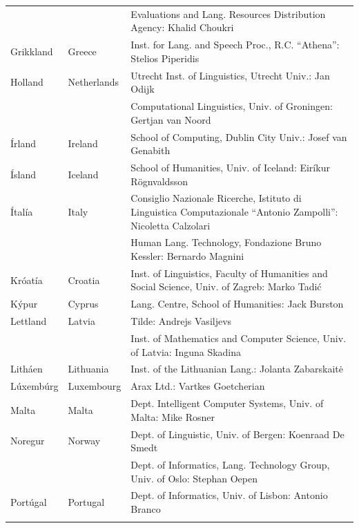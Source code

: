 \documentclass{../../metanetpaper}
\begin{document}
\begin{longtable}{llp{105mm}}
  & & Evaluations and Lang. Resources Distribution Agency: Khalid Choukri\\ \addlinespace 
  Grikkland & \textcolor{grey1}{Greece} & Inst. for Lang. and Speech Proc., R.C. “Athena”: Stelios Piperidis\\ \addlinespace 
  Holland & \textcolor{grey1}{Netherlands} & Utrecht Inst. of Linguistics, Utrecht Univ.: Jan Odijk\\ \addlinespace 
  & & Computational Linguistics, Univ. of Groningen: Gertjan van Noord\\ \addlinespace
  Írland & \textcolor{grey1}{Ireland} & School of Computing, Dublin City Univ.: Josef van Genabith\\ \addlinespace
  Ísland & \textcolor{grey1}{Iceland} & School of Humanities, Univ. of Iceland: Eiríkur Rögnvaldsson\\ \addlinespace
  Ítalía & \textcolor{grey1}{Italy} & Consiglio Nazionale Ricerche, Istituto di Linguistica Computazionale “Antonio Zampolli”: Nicoletta Calzolari\\ \addlinespace
  & & Human Lang. Technology, Fondazione Bruno Kessler: Bernardo Magnini\\ \addlinespace 
  Króatía & \textcolor{grey1}{Croatia} & Inst. of Linguistics, Faculty of Humanities and Social Science, Univ. of Zagreb: Marko Tadić \\ \addlinespace
  Kýpur & \textcolor{grey1}{Cyprus} & Lang. Centre, School of Humanities: Jack Burston\\ \addlinespace 
  Lettland & \textcolor{grey1}{Latvia} & Tilde: Andrejs Vasiljevs\\ \addlinespace 
  & & Inst. of Mathematics and Computer Science, Univ. of Latvia: Inguna Skadina\\ \addlinespace
  Litháen & \textcolor{grey1}{Lithuania} & Inst. of the Lithuanian Lang.: Jolanta Zabarskaitė\\ \addlinespace
  Lúxembúrg & \textcolor{grey1}{Luxembourg} & Arax Ltd.: Vartkes Goetcherian\\ \addlinespace
  Malta & \textcolor{grey1}{Malta} & Dept. Intelligent Computer Systems, Univ. of Malta: Mike Rosner\\ \addlinespace
  Noregur & \textcolor{grey1}{Norway} & Dept. of Linguistic, Univ. of Bergen: Koenraad De Smedt\\ \addlinespace 
  & & Dept. of Informatics, Lang. Technology Group, Univ. of Oslo: Stephan Oepen \\ \addlinespace
  Portúgal & \textcolor{grey1}{Portugal} & Dept. of Informatics, Univ. of Lisbon: Antonio Branco\\ \addlinespace

\end{longtable}
\end{document}
